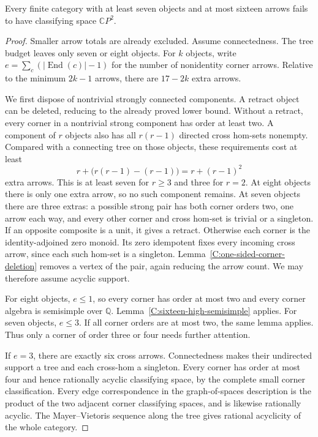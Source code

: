 \begin{theorem}
\label{C:sixteen-seven-objects}
Every finite category with at least seven objects and at most
sixteen arrows fails to have classifying space $\mathbb CP^2$.
\end{theorem}
\begin{proof}
Smaller arrow totals are already excluded.  Assume connectedness.
The tree budget leaves only seven or eight objects.  For $k$
objects, write $e=\sum_c(|\operatorname{End}(c)|-1)$ for the
number of nonidentity corner arrows.  Relative to the minimum
$2k-1$ arrows, there are $17-2k$ extra arrows.

We first dispose of nontrivial strongly connected components.
A retract object can be deleted, reducing to the already
proved lower bound.  Without a retract, every corner in a
nontrivial strong component has order at least two.  A
component of $r$ objects also has all $r(r-1)$ directed cross
hom-sets nonempty.  Compared with a connecting tree on those
objects, these requirements cost at least
\[
 r+\bigl(r(r-1)-(r-1)\bigr)=r+(r-1)^2
\]
extra arrows.  This is at least seven for $r\geq3$ and three
for $r=2$.  At eight objects there is only one extra arrow,
so no such component remains.  At seven objects there are
three extras: a possible strong pair has both corner orders
two, one arrow each way, and every other corner and cross
hom-set is trivial or a singleton.  If an opposite composite
is a unit, it gives a retract.  Otherwise each corner is the
identity-adjoined zero monoid.  Its zero idempotent fixes every
incoming cross arrow, since each such hom-set is a singleton.
Lemma~\ref{C:one-sided-corner-deletion} removes a vertex of
the pair, again reducing the arrow count.  We may therefore
assume acyclic support.

For eight objects, $e\leq1$, so every corner has order at
most two and every corner algebra is semisimple over
$\mathbb Q$.  Lemma~\ref{C:sixteen-high-semisimple} applies.
For seven objects, $e\leq3$.  If all corner orders are at
most two, the same lemma applies.  Thus only a corner of
order three or four needs further attention.

If $e=3$, there are exactly six cross arrows.  Connectedness
makes their undirected support a tree and each cross-hom a
singleton.  Every corner has order at most four and hence
rationally acyclic classifying space, by the complete small
corner classification.  Every edge correspondence in the
graph-of-spaces description is the product of the two adjacent
corner classifying spaces, and is likewise rationally acyclic.
The Mayer--Vietoris sequence along the tree gives rational
acyclicity of the whole category.


\end{proof}
